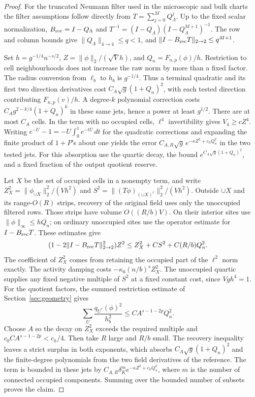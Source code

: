\documentclass[11pt]{article}
\theoremstyle{definition}
\begin{document}
\begin{proof}
For the truncated Neumann filter used in the microscopic and
bulk charts the filter assumptions follow directly from
\(T=\sum_{j=0}^{M}Q_\Lambda^j\). Up to the fixed scalar
normalization, \(B_{\rm rec}=I-Q_\Lambda\) and
\(T^{-1}=(I-Q_\Lambda)(I-Q_\Lambda^{M+1})^{-1}\).
The row and column bounds give
\(\|Q_\Lambda\|_{4\to4}\le q<1\), and
\(\|I-B_{\rm rec}T\|_{2\to2}\le q^{M+1}\).

Set \(h=g^{-1/4}n^{-s/2}\),
\(Z=\|\phi\|_2/(\sqrt Vh)\), and \(Q_n=F_{n,p}(\phi)/h\).
Restriction to cell neighbourhoods does not increase the
raw norm by more than a fixed factor. The radius conversion
from \(\ell_b\) to \(h_b\) is \(g^{-1/4}\).
Thus a terminal quadratic and its first two direction
derivatives cost \(C_A\sqrt g(1+Q_n)^2\), with each tested
direction contributing \(F_{n,p}(v)/h\). A degree-\(k\)
polynomial correction costs \(C_A g^{2-k/4}(1+Q_n)^k\)
in these same jets, hence a power at least \(g^{1/2}\).
There are at most \(C_A\) cells. In the term with no occupied
cells, \(\ell^4\) invertibility gives \(V_4\ge c Z^4\).
Writing \(e^{-U}-1=-U\int_0^1e^{-tU}\,dt\) for the
quadratic corrections and expanding the finite product
of \(1+P\)'s about one yields the error
\(C_{A,R}\sqrt g\,e^{-\kappa Z^2+c_h Q_n^2}\) in the two
tested jets. For this absorption use the quartic decay,
the bound \(e^{C_A\sqrt g(1+Q_n)^2}\), and a fixed
fraction of the output quotient reserve.

Let \(X\) be the set of occupied cells in a nonempty term,
and write \(Z_X^2=\|\phi_{\cup X}\|_2^2/(Vh^2)\) and
\(S^2=\|(T\phi)_{(\cup X)^c}\|_2^2/(Vh^2)\).
Outside \(\cup X\) and its range-\(O(R)\) strips, recovery
of the original field uses only the unoccupied filtered
rows. Those strips have volume \(O((R/b)V)\). On their
interior sites use \(\|\phi\|_\infty\le h Q_n\);
on ordinary unoccupied sites use the operator estimate
for \(I-B_{\rm rec}T\). These estimates give
\begin{equation}
 (1-2\|I-B_{\rm rec}T\|_{2\to2}^2) Z^2
    \le Z_X^2+C S^2+C(R/b)Q_n^2 .
\end{equation}
The coefficient of \(Z_X^2\) comes from retaining the
occupied part of the \(\ell^2\) norm exactly. The activity
damping costs \(-\kappa_0 (n/b)^s Z_X^2\). The unoccupied
quartic supplies any fixed negative multiple of \(S^2\)
at a fixed constant cost, since \(Vgh^4=1\).
For the quotient factors, the summed restriction estimate
of Section~\ref{sec:geometry} gives
\begin{equation}
 \sum_U \frac{q_{U^*}(\phi)^2}{h_b^2}
       \le C A^{s-1-2p} Q_n^2 .
\end{equation}
Choose \(A\) so the decay on \(Z_X^2\) exceeds the
required multiple and \(c_0 C A^{s-1-2p}<c_h/4\).
Then take \(R\) large and \(R/b\) small. The recovery
inequality leaves a strict surplus in both exponents,
which absorbs \(C_A\sqrt g(1+Q_n)^2\) and the finite-degree
polynomials from the two field derivatives of the reference.
The term is bounded in these jets by
\(C_{A,R}\delta_K^m e^{-\kappa Z^2+c_h Q_n^2}\), where \(m\)
is the number of connected occupied components.
Summing over the bounded number of subsets proves the claim.
\end{proof}
\end{document}
